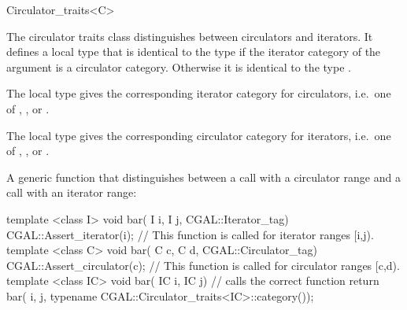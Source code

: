 
\begin{ccRefClass}{Circulator_traits<C>}

\ccDefinition

The circulator traits class distinguishes between circulators and
iterators. It defines a local type  that is identical to the
type  if the iterator category of the argument
 is a circulator category. Otherwise it is identical to the type
.

The local type  gives the corresponding
iterator category for circulators, i.e.~one of
, , or
.

The local type  gives the corresponding
circulator category for iterators, i.e.~one of
, , or
.


\ccTypes



\ccExample

A generic function  that distinguishes between a call with a 
circulator range and a call with an iterator range:

\begin{ccExampleCode}
template <class I>
void bar( I i, I j, CGAL::Iterator_tag) {
    CGAL::Assert_iterator(i);
    // This function is called for iterator ranges [i,j).
}
template <class C>
void bar( C c, C d, CGAL::Circulator_tag) {
    CGAL::Assert_circulator(c);
    // This function is called for circulator ranges [c,d).
}
template <class IC>
void bar( IC i, IC j) {  // calls the correct function
    return bar( i, j, typename CGAL::Circulator_traits<IC>::category());
}
\end{ccExampleCode}

\end{ccRefClass}

